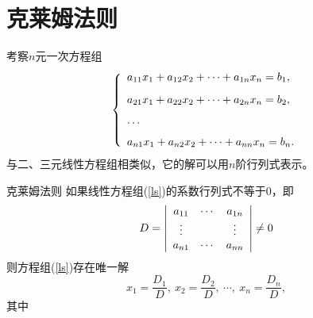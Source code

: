 \section{克莱姆法则}

\begin{frame}
  \begin{footnotesize}
    考察$n$元一次方程组
    \begin{equation}\label{ls}
      \left\{
      \begin{array}{l}
        a_{11}x_1 + a_{12}x_2 + \cdots + a_{1n}x_n = b_1, \\[0.3cm]
        a_{21}x_1 + a_{22}x_2 + \cdots + a_{2n}x_n = b_2, \\[0.3cm]
        \cdots \\[0.2cm]
        a_{n1}x_1 + a_{n2}x_2 + \cdots + a_{nn}x_n = b_n.
      \end{array}
      \right.
    \end{equation}
    与二、三元线性方程组相类似，它的解可以用$n$阶行列式表示。
  \end{footnotesize}
\end{frame}


\begin{frame}
  \begin{footnotesize}
    \begin{block}{克莱姆法则}
      如果线性方程组(\ref{ls})的系数行列式不等于0，即
      $$
      D = \left|
      \begin{array}{ccc}
        a_{11}  & \cdots  & a_{1n} \\
        \vdots    &      & \vdots  \\
        a_{n1}  & \cdots  & a_{nn}
      \end{array}
      \right|\ne 0
      $$
      则方程组(\ref{ls})存在唯一解
      $$
      x_1 = \frac{D_1}D, \ x_2 = \frac{D_2} D, \ \cdots, \ x_n = \frac{D_n}D,
      $$
      其中
      \begin{center}
      \end{center}
    \end{block}
  \end{footnotesize}
\end{frame}

